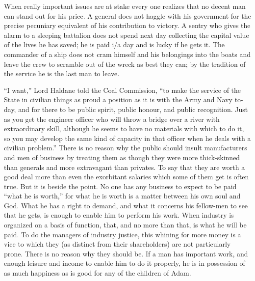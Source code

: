 \documentclass{book}
\begin{document}
When really important issues are at stake every one realizes that no decent man can stand out for his price. A general does not haggle with his government for the precise pecuniary equivalent of his contribution to victory. A sentry who gives the alarm to a sleeping battalion does not spend next day collecting the capital value of the lives he has saved; he is paid i/a day and is lucky if he gets it. The commander of a ship does not cram himself and his belongings into the boats and leave the crew to scramble out of the wreck as best they can; by the tradition of the service he is the last man to leave.

“I want,” Lord Haldane told the Coal Commission, “to make the service of the State in civilian things as proud a position as it is with the Army and Navy to-day, and for there to be public spirit, public honour, and public recognition. Just as you get the engineer officer who will throw a bridge over a river with extraordinary skill, although he seems to have no materials with which to do it, so you may develop the same kind of capacity in that officer when he deals with a civilian problem.” There is no reason why the public should insult manufacturers and men of business by treating them as though they were more thick-skinned than generals and more extravagant than privates. To say that they are worth a good deal more than even the exorbitant salaries which some of them get is often true. But it is beside the point. No one has any business to expect to be paid “what he is worth,” for what he is worth is a matter between his own soul and God. What he has a right to demand, and what it concerns his fellow-men to see that he gets, is enough to enable him to perform his work. When industry is organized on a basis of function, that, and no more than that, is what he will be paid. To do the managers of industry justice, this whining for more money is a vice to which they (as distinct from their shareholders) are not particularly prone. There is no reason why they should be. If a man has important work, and enough leisure and income to enable him to do it properly, he is in possession of as much happiness as is good for any of the children of Adam.
\end{document}
